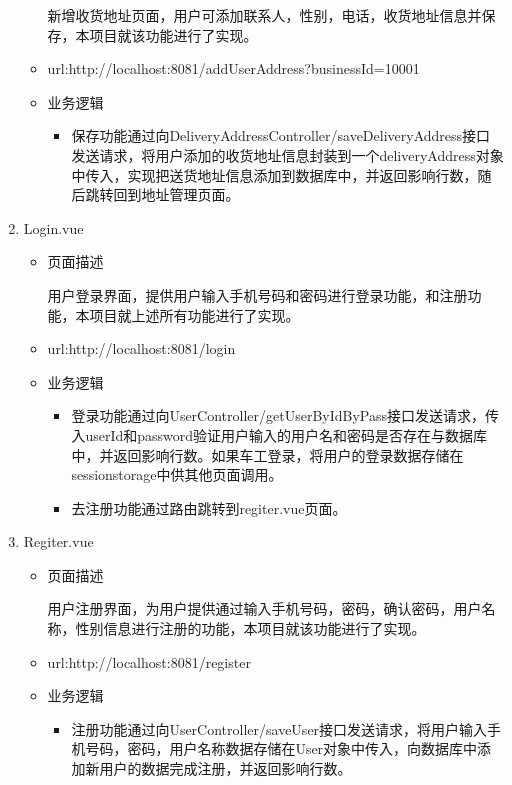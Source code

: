 \begin{enumerate}
\begin{itemize}
    新增收货地址页面，用户可添加联系人，性别，电话，收货地址信息并保存，本项目就该功能进行了实现。

    \item url:http://localhost:8081/addUserAddress?businessId=10001
    
    \item 业务逻辑
    \begin{itemize}
      \item 保存功能通过向DeliveryAddressController/saveDeliveryAddress接口发送请求，将用户添加的收货地址信息封装到一个deliveryAddress对象中传入，实现把送货地址信息添加到数据库中，并返回影响行数，随后跳转回到地址管理页面。
      \end{itemize}
  \end{itemize}

  \item Login.vue
  \begin{itemize}
    \item 页面描述
    
    用户登录界面，提供用户输入手机号码和密码进行登录功能，和注册功能，本项目就上述所有功能进行了实现。

    \item url:http://localhost:8081/login
    
    \item 业务逻辑
    \begin{itemize}
      \item 登录功能通过向UserController/getUserByIdByPass接口发送请求，传入userId和password验证用户输入的用户名和密码是否存在与数据库中，并返回影响行数。如果车工登录，将用户的登录数据存储在sessionstorage中供其他页面调用。
      \item 去注册功能通过路由跳转到regiter.vue页面。
      \end{itemize}
  \end{itemize}

  \item Regiter.vue
  \begin{itemize}
    \item 页面描述
    
    用户注册界面，为用户提供通过输入手机号码，密码，确认密码，用户名称，性别信息进行注册的功能，本项目就该功能进行了实现。

    \item url:http://localhost:8081/register
    
    \item 业务逻辑
    \begin{itemize}
      \item 注册功能通过向UserController/saveUser接口发送请求，将用户输入手机号码，密码，用户名称数据存储在User对象中传入，向数据库中添加新用户的数据完成注册，并返回影响行数。
      \end{itemize}
  \end{itemize}


\end{enumerate}
